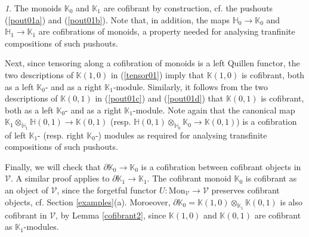 \documentclass[10pt]{amsart}
\theoremstyle{plain}
\theoremstyle{remark}
\newtheorem{stit}[subsection]{}
\def\Vv{\mathcal{V}}
\def\Mon{\mathrm{Mon}}
\def\HH{\mathbb{H}}
\def\KK{\mathbb{K}}
\begin{document}
\begin{stit}
The monoids $\KK_0$ and $\KK_1$ are cofibrant by construction, cf. the pushouts (\ref{pout01a}) and (\ref{pout01b}). Note that, in addition, the maps $\HH_0\to\KK_0$ and $\HH_1\to\KK_1$ are cofibrations of monoids, a property needed for analysing tranfinite compositions of such pushouts.

Next, since tensoring along a cofibration of monoids is a left Quillen functor, the two descriptions of $\KK(1,0)$ in (\ref{tensor01}) imply that $\KK(1,0)$ is cofibrant, both as a left $\KK_0$- and as a right $\KK_1$-module. Similarly, it follows from the two descriptions of $\KK(0,1)$ in (\ref{pout01c}) and (\ref{pout01d}) that $\KK(0,1)$ is cofibrant, both as a left $\KK_0$- and as a right $\KK_1$-module. Note again that the canonical map $\KK_1\otimes_{\HH_1}\HH(0,1)\to\KK(0,1)$ (resp. $\HH(0,1)\otimes_{\HH_0}\KK_0\to\KK(0,1)$) is a cofibration of left $\KK_1$- (resp. right $\KK_0$-) modules as required for analysing transfinite compositions of such pushouts.

Finally, we will check that $\partial\KK_0\to\KK_0$ is a cofibration between cofibrant objects in $\Vv$. A similar proof applies to $\partial\KK_1\to\KK_1$. The cofibrant monoid $\KK_0$ is cofibrant as an object of $\Vv$, since the forgetful functor $U:\Mon_\Vv\to\Vv$ preserves cofibrant objects, cf. Section \ref{examples}(a). Moroeover, $\partial\KK_0=\KK(1,0)\otimes_{\KK_1}\KK(0,1)$ is also cofibrant in $\Vv$, by Lemma \ref{cofibrant2}, since $\KK(1,0)$ and $\KK(0,1)$ are cofibrant as $\KK_1$-modules.


\end{stit}
\end{document}
